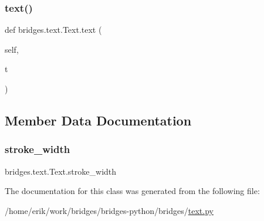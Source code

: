 \mbox{\label{classbridges_1_1text_1_1_text_af204cecbce4b55dff1079ca9f96a309e}} 
\subsubsection{\texorpdfstring{text()}{text()}\hspace{0.1cm}{\footnotesize\ttfamily [2/2]}}
{\footnotesize\ttfamily def bridges.\+text.\+Text.\+text (\begin{DoxyParamCaption}\item[{}]{self,  }\item[{}]{t }\end{DoxyParamCaption})}



\subsection{Member Data Documentation}
\mbox{\label{classbridges_1_1text_1_1_text_a4664e061e917f1670458e435a3dafb79}} 
\subsubsection{\texorpdfstring{stroke\+\_\+width}{stroke\_width}}
{\footnotesize\ttfamily bridges.\+text.\+Text.\+stroke\+\_\+width}



The documentation for this class was generated from the following file\+:\begin{DoxyCompactItemize}
\item 
/home/erik/work/bridges/bridges-\/python/bridges/\hyperlink{text_8py}{text.\+py}\end{DoxyCompactItemize}
